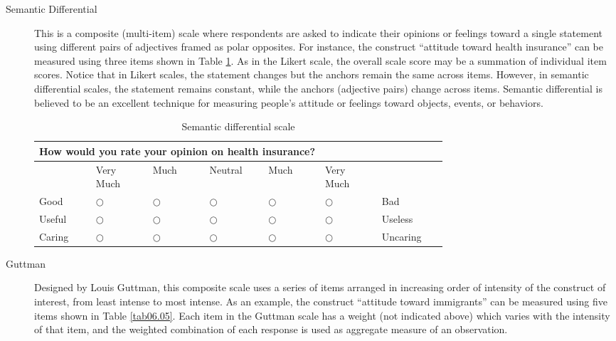\begin{description}
	\item[Semantic Differential] This is a composite (multi-item) scale where respondents are asked to indicate their opinions or feelings toward a single statement using different pairs of adjectives framed as polar opposites. For instance, the construct ``attitude toward health insurance'' can be measured using three items shown in Table \ref{tab06.04}. As in the Likert scale, the overall scale score may be a summation of individual item scores. Notice that in Likert scales, the statement changes but the anchors remain the same across items. However, in semantic differential scales, the statement remains constant, while the anchors (adjective pairs) change across items. Semantic differential is believed to be an excellent technique for measuring people's attitude or feelings toward objects, events, or behaviors. 
	
	
	\begin{table}[H]
		\centering
		\begin{tabularx}{0.95\linewidth}{p{0.10\linewidth}p{0.10\linewidth}p{0.10\linewidth}p{0.10\linewidth}p{0.10\linewidth}p{0.10\linewidth}p{0.10\linewidth}}
			\toprule
			\multicolumn{7}{p{0.95\linewidth}}{How would you rate your opinion on health insurance?} \\	
			\midrule
			{} & {\footnotesize Very Much} & {\footnotesize Much} & {\footnotesize Neutral} & {\footnotesize Much} & {\footnotesize Very Much} & {} \\
			\midrule
			{\footnotesize Good} & $ \bigcirc $ & $ \bigcirc $ & $ \bigcirc $ & $ \bigcirc $ & $ \bigcirc $ & {\footnotesize Bad} \\
			{\footnotesize Useful} & $ \bigcirc $ & $ \bigcirc $ & $ \bigcirc $ & $ \bigcirc $ & $ \bigcirc $ & {\footnotesize Useless} \\
			{\footnotesize Caring} & $ \bigcirc $ & $ \bigcirc $ & $ \bigcirc $ & $ \bigcirc $ & $ \bigcirc $ & {\footnotesize Uncaring} \\
			\bottomrule
		\end{tabularx}
		\caption{Semantic differential scale}
		\label{tab06.04}
	\end{table}
	
	\item[Guttman] Designed by Louis Guttman, this composite scale uses a series of items arranged in increasing order of intensity of the construct of interest, from least intense to most intense. As an example, the construct ``attitude toward immigrants'' can be measured using five items shown in Table \ref{tab06.05}. Each item in the Guttman scale has a weight (not indicated above) which varies with the intensity of that item, and the weighted combination of each response is used as aggregate measure of an observation.


\end{description}
